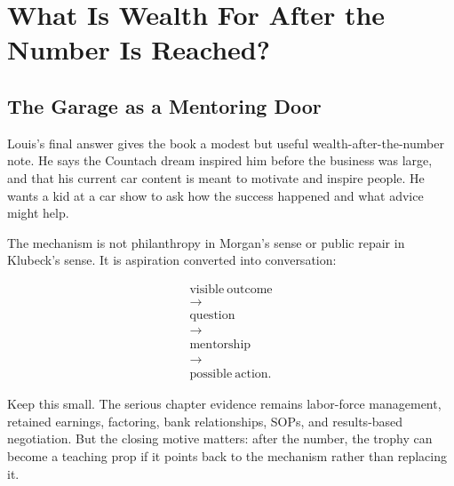 \documentclass[11pt,oneside]{book}
\begin{document}
\chapter{What Is Wealth For After the Number Is Reached?}

\section{The Garage as a Mentoring Door}

Louis's final answer gives the book a modest but useful wealth-after-the-number note. He says the Countach dream inspired him before the business was large, and that his current car content is meant to motivate and inspire people. He wants a kid at a car show to ask how the success happened and what advice might help.

The mechanism is not philanthropy in Morgan's sense or public repair in Klubeck's sense. It is aspiration converted into conversation:

\begin{equation}
\begin{gathered}
\mathrm{visible\ outcome}\\
\rightarrow\\
\mathrm{question}\\
\rightarrow\\
\mathrm{mentorship}\\
\rightarrow\\
\mathrm{possible\ action}.
\end{gathered}
\end{equation}

Keep this small. The serious chapter evidence remains labor-force management, retained earnings, factoring, bank relationships, SOPs, and results-based negotiation. But the closing motive matters: after the number, the trophy can become a teaching prop if it points back to the mechanism rather than replacing it.

\end{document}
